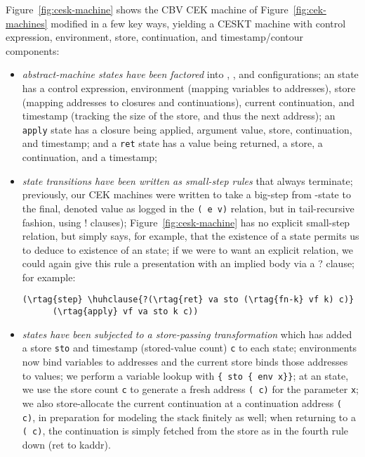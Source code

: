 Figure~\ref{fig:cesk-machine} shows the CBV CEK machine of Figure~\ref{fig:cek-machines} modified in a few key ways, yielding a CESKT machine with control expression, environment, store, continuation, and timestamp/contour components:
%
\begin{itemize}
\item
  \emph{abstract-machine states have been factored} into , , and  configurations; an  state has a control expression, environment (mapping variables to addresses), store (mapping addresses to closures and continuations), current continuation, and timestamp (tracking the size of the store, and thus the next address); an \texttt{apply} state has a closure being applied, argument value, store, continuation, and timestamp; and a \texttt{ret} state has a value being returned, a store, a continuation, and a timestamp;  
\item
  \emph{state transitions have been written as small-step rules} that always terminate; previously, our CEK machines were written to take a big-step from -state to the final, denoted value as logged in the \texttt{( e v)} relation, but in tail-recursive fashion, using ! clauses); Figure~\ref{fig:cesk-machine} has no explicit small-step relation, but simply says, for example, that the existence of a  state permits us to deduce to existence of an  state; if we were to want an explicit  relation, we could again give this rule a presentation with an implied body via a ? clause; for example:
\begin{Verbatim}[baselinestretch=.75,commandchars=\\\{\}]
(\rtag{step} \huhclause{?(\rtag{ret} va sto (\rtag{fn-k} vf k) c)}
      (\rtag{apply} vf va sto k c))
\end{Verbatim}
\item
  \emph{states have been subjected to a store-passing transformation} which has added a store \texttt{sto} and timestamp (stored-value count) \texttt{c} to each state; environments now bind variables to addresses and the current store binds those addresses to values; we perform a variable lookup with \texttt{\{ sto \{ env x\}\}}; at an  state, we use the store count \texttt{c} to generate a fresh address \texttt{( c)} for the parameter \texttt{x}; we also store-allocate the current continuation at a continuation address \texttt{( c)}, in preparation for modeling the stack finitely as well; when returning to a \texttt{( c)}, the continuation is simply fetched from the store as in the fourth rule down (ret to kaddr).
\end{itemize}

